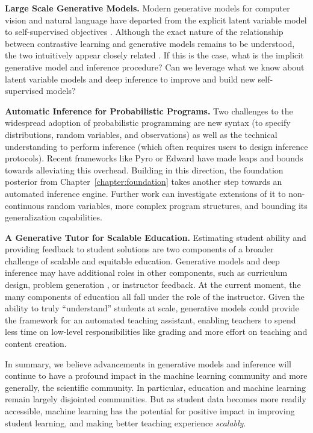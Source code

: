 \noindent\textbf{Large Scale Generative Models.} Modern generative models for computer vision and natural language \cite{radford2021learning,ramesh2021zero,brown2020language} have departed from the explicit latent variable model to self-supervised objectives \cite{chen2020improved,chen2020simple,chen2021exploring,grill2020bootstrap}. Although the exact nature of the relationship between contrastive learning and generative models remains to be understood, the two intuitively appear closely related \cite{zimmermann2021contrastive,liu2021self}. If this is the case, what is the implicit generative model and inference procedure? Can we leverage what we know about latent variable models and deep inference to improve and build new self-supervised models?  \newline

\noindent\textbf{Automatic Inference for Probabilistic Programs.} Two challenges to the widespread adoption of probabilistic programming are new syntax (to specify distributions, random variables, and observations) as well as the technical understanding to perform inference (which often requires users to design inference protocols). Recent frameworks like Pyro \cite{bingham2019pyro} or Edward \cite{tran2017deep} have made leaps and bounds towards alleviating this overhead. Building in this direction, the foundation posterior from Chapter~\ref{chapter:foundation} takes another step towards an automated inference engine. Further work can investigate extensions of it to non-continuous random variables, more complex program structures, and bounding its generalization capabilities.  \newline

\noindent\textbf{A Generative Tutor for Scalable Education.} Estimating student ability and providing feedback to student solutions are two components of a broader challenge of scalable and equitable education. Generative models and deep inference may have additional roles in other components, such as curriculum design, problem generation \cite{srivastava2021question}, or instructor feedback. At the current moment, the many components of education all fall under the role of the instructor. Given the ability to truly ``understand'' students at scale, generative models could provide the framework for an automated teaching assistant, enabling teachers to spend less time on low-level responsibilities like grading and more effort on teaching and content creation.\newline  

In summary, we believe advancements in generative models and inference will continue to have a profound impact in the machine learning community and more generally, the scientific community. In particular, education and machine learning remain largely disjointed communities. But as student data becomes more readily accessible, machine learning has the potential for positive impact in improving student learning, and making better teaching experience \textit{scalably}.
